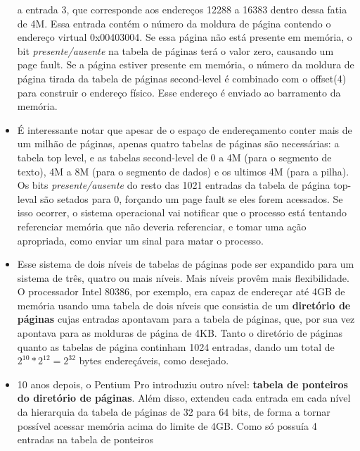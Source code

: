 \documentclass[10pt]{article}
\begin{document}
\begin{itemize}
        a entrada 3, que corresponde aos endereços 12288 a 16383 dentro dessa fatia
        de 4M. Essa entrada contém o número da moldura de página contendo o endereço
        virtual 0x00403004. Se essa página não está presente em memória, o bit
        \textit{presente/ausente} na tabela de páginas terá o valor zero, causando
        um page fault. Se a página estiver presente em memória, o número da moldura
        de página tirada da tabela de páginas second-level é combinado com o offset(4) 
        para construir o endereço físico. Esse endereço é enviado ao barramento da memória.
    \item É interessante notar que apesar de o espaço de endereçamento conter mais de um
        milhão de páginas, apenas quatro tabelas de páginas são necessárias: a tabela
        top level, e as tabelas second-level de 0 a 4M (para o segmento de texto), 
        4M a 8M (para o segmento de dados) e os ultimos 4M (para a pilha). Os bits
        \textit{presente/ausente} do resto das 1021 entradas da tabela de página 
        top-leval são setados para 0, forçando um page fault se eles forem acessados.
        Se isso ocorrer, o sistema operacional vai notificar que o processo está 
        tentando referenciar memória que não deveria referenciar, e tomar uma 
        ação apropriada, como enviar um sinal para matar o processo. 
    \item Esse sistema de dois níveis de tabelas de páginas pode ser expandido
        para um sistema de três, quatro ou mais níveis. Mais níveis provêm
        mais flexibilidade. O processador Intel 80386, por exemplo, era capaz
        de endereçar até 4GB de memória usando uma tabela de dois níveis que 
        consistia de um \textbf{diretório de páginas} cujas entradas apontavam
        para a tabela de páginas, que, por sua vez apontava para as molduras
        de página de 4KB. Tanto o diretório de páginas quanto as tabelas de página
        continham 1024 entradas, dando um total de 
        \begin{math} 2^{10} * 2^{12} = 2^{32}\end{math} bytes endereçáveis, como
        desejado.
    \item 10 anos depois, o Pentium Pro introduziu outro nível: 
        \textbf{tabela de ponteiros do diretório de páginas}. Além disso, 
        extendeu cada entrada em cada nível da hierarquia da tabela de páginas 
        de 32 para 64 bits, de forma a tornar possível acessar memória acima
        do limite de 4GB. Como só possuía 4 entradas na tabela de ponteiros

\end{itemize}
\end{document}
